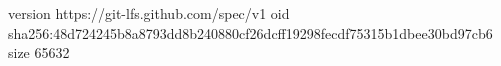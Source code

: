 version https://git-lfs.github.com/spec/v1
oid sha256:48d724245b8a8793dd8b240880cf26dcff19298fecdf75315b1dbee30bd97cb6
size 65632
